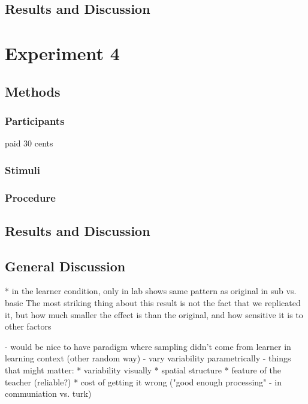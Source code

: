 \documentclass[man]{apa2}
\begin{document}
\subsection{Results and Discussion}

\section{Experiment 4}


\subsection{Methods}

\subsubsection{Participants}  paid 30 cents
\subsubsection{Stimuli}


\subsubsection{Procedure}

\subsection{Results and Discussion}

\subsection{General Discussion}
* in the learner condition, only in lab shows same pattern as original in sub vs. basic
The most striking thing about this result is not the fact that we replicated it, but how much smaller the effect is than the original, and how sensitive it is to other factors

- would be nice to have paradigm where sampling didn't come from learner in learning context (other random way)
- vary variability parametrically
- things that might matter:
* variability visually
* spatial structure
* feature of the teacher (reliable?)
* cost of getting it wrong ("good enough processing" - in communiation vs. turk)

\nocite{sanchez2003effect}




\newpage
\theappendix 
\end{document}
